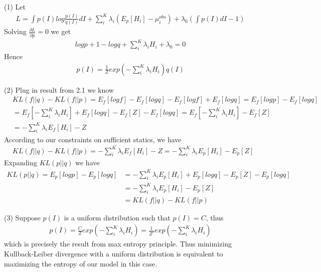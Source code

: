 \documentclass[12pt]{article}
\newenvironment{problem}[2][Problem]{\begin{trivlist}
\item[\hskip \labelsep {\bfseries #1}\hskip \labelsep {\bfseries #2}]}{\end{trivlist}}
\begin{document}
\begin{problem}{2.}
\item{(1)}
Let
\begin{align*}
	L = \int p(I)log\frac{p(I)}{q(I)} dI + \sum_i^K \lambda_i (E_p[H_i] - \mu_i^{obs}) + \lambda_0 (\int p(I) dI - 1)
\end{align*}
Solving $\frac{\partial L}{\partial p} = 0$ we get
\begin{align*}
	logp + 1 - logq + \sum_i^K \lambda_i H_i + \lambda_0 = 0
\end{align*}
Hence
\begin{align*}
	p(I) = \frac{1}{Z} exp(-\sum_i^K\lambda_iH_i) q(I)
\end{align*}
\item{(2)}
Plug in result from 2.1 we know
\begin{align*}
	&KL(f||q) - KL(f||p) = E_f[logf] - E_f[logq] - E_f[logf] + E_f[logq] = E_f[logp] - E_f[logq]\\
&= E_f[-\sum_i^K \lambda_iH_i] + E_f[logq] - E_f[Z] - E_f[logq] = E_f[-\sum_i^K \lambda_iH_i] - E_f[Z]\\
&= -\sum_i^K\lambda_iE_f[H_i] - Z
\end{align*}
According to our constraints on sufficient statics, we have
\begin{align*}
	&KL(f||q) - KL(f||p) = -\sum_i^K\lambda_iE_f[H_i] - Z = -\sum_i^K\lambda_iE_p[H_i] - E_p[Z]
\end{align*}
Expanding $KL(p||q)$ we have
\begin{align*}
	KL(p||q) = E_p[logp] - E_p[logq] &= -\sum_i^K\lambda_iE_p[H_i] + E_p[logq] - E_p[Z] - E_p[logq]\\
&= -\sum_i^K\lambda_iE_p[H_i] - E_p[Z] \\
&= KL(f||q) - KL(f||p)
\end{align*}
\item{(3)}
Suppose $p(I)$ is a uniform distribution such that $p(I) = C$, thus
\begin{align*}
	p(I) = \frac{C}{Z} exp(-\sum_i^K\lambda_iH_i) = \frac{1}{Z'} exp(-\sum_i^K\lambda_iH_i)
\end{align*}
which is precisely the result from max entropy principle. Thus minimizing Kullback-Leiber divergence with a uniform distribution is equivalent to maximizing the entropy of our model in this case.
\end{problem}
\end{document}
